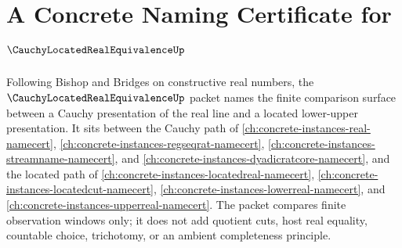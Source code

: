 \chapter{A Concrete Naming Certificate for $\CauchyLocatedRealEquivalenceUp$}
\label{ch:concrete-instances-cauchy-located-real-equivalence-namecert}

Following Bishop and Bridges on constructive real numbers, the $\CauchyLocatedRealEquivalenceUp$ packet names the finite comparison surface between a Cauchy presentation of the real line and a located lower-upper presentation. It sits between the Cauchy path of \autoref{ch:concrete-instances-real-namecert}, \autoref{ch:concrete-instances-regseqrat-namecert}, \autoref{ch:concrete-instances-streamname-namecert}, and \autoref{ch:concrete-instances-dyadicratcore-namecert}, and the located path of \autoref{ch:concrete-instances-locatedreal-namecert}, \autoref{ch:concrete-instances-locatedcut-namecert}, \autoref{ch:concrete-instances-lowerreal-namecert}, and \autoref{ch:concrete-instances-upperreal-namecert}. The packet compares finite observation windows only; it does not add quotient cuts, host real equality, countable choice, trichotomy, or an ambient completeness principle.

